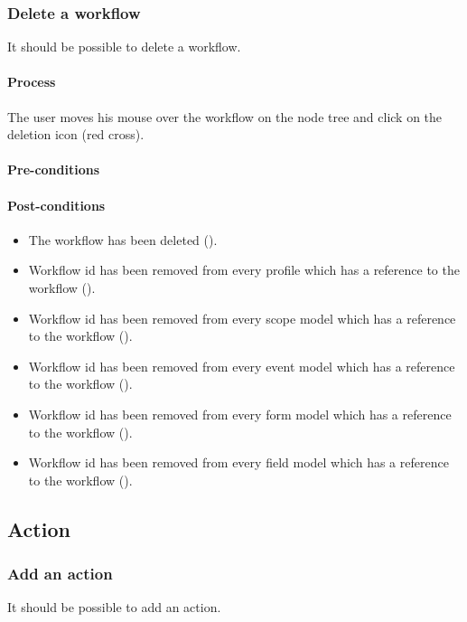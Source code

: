 \documentclass[11pt,a4paper,oneside]{article}
\begin{document}
\subsubsection{Delete a workflow}
It should be possible to delete a workflow.

\paragraph{Process}
The user moves his mouse over the workflow on the node tree and click on the deletion icon (red cross).

\paragraph{Pre-conditions}

\paragraph{Post-conditions}
\begin{itemize}
	\item The workflow has been deleted ().
	\item Workflow id has been removed from every profile which has a reference to the workflow ().
	\item Workflow id has been removed from every scope model which has a reference to the workflow ().
	\item Workflow id has been removed from every event model which has a reference to the workflow ().
	\item Workflow id has been removed from every form model which has a reference to the workflow ().
	\item Workflow id has been removed from every field model which has a reference to the workflow ().
\end{itemize}

\subsection{Action}

\subsubsection{Add an action}
It should be possible to add an action.
\end{document}
